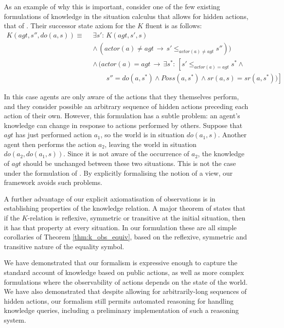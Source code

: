 As an example of why this is important, consider one of the few existing
formulations of knowledge in the situation calculus that allows for
hidden actions, that of \citep{Lesperance99sitcalc_approach}. Their
successor state axiom for the $K$ fluent is as follows:\begin{align*}
K(agt,s'',do(a,s))\equiv\,\,\, & \exists s':\, K(agt,s',s)\\
 & \wedge\,(actor(a)\neq agt\,\rightarrow\, s'\leq_{actor(a)\neq agt}s''))\\
 & \wedge\,(actor(a)=agt\,\rightarrow\,\exists s^{*}:\,\left[s'\leq_{actor(a)=agt}s^{*}\wedge\right.\\
 & \,\,\,\,\,\,\,\,\,\,\,\,\left.s''=do(a,s^{*})\wedge Poss(a,s^{*})\wedge sr(a,s)=sr(a,s^{*}))\right]\end{align*}


In this case agents are only aware of the actions that they themselves
perform, and they consider possible an arbitrary sequence of hidden
actions preceding each action of their own. However, this formulation
has a subtle problem: an agent's knowledge can change in response
to actions performed by others. Suppose that $agt$ has just performed
action $a_{1}$, so the world is in situation $do(a_{1},s)$. Another
agent then performs the action $a_{2}$, leaving the world in situation
$do(a_{2},do(a_{1},s))$. Since it is not aware of the occurrence
of $a_{2}$, the knowledge of $agt$ should be unchanged between these
two situations. This is not the case under the formulation of \citeauthor{Lesperance99sitcalc_approach}.
By explicitly formalising the notion of a view, our framework avoids
such problems.

A further advantage of our explicit axiomatisation of observations
is in establishing properties of the knowledge relation. A major theorem
of \citet{scherl03sc_knowledge} states that if the $K$-relation
is reflexive, symmetric or transitive at the initial situation, then
it has that property at every situation. In our formulation these
are all simple corollaries of Theorem \ref{thm:k_obs_equiv}, based
on the reflexive, symmetric and transitive nature of the equality
symbol.

We have demonstrated that our formalism is expressive enough to capture
the standard account of knowledge based on public actions, as well
as more complex formulations where the observability of actions depends
on the state of the world. We have also demonstrated that despite
allowing for arbitrarily-long sequences of hidden actions, our formalism
still permits automated reasoning for handling knowledge queries,
including a preliminary implementation of such a reasoning system.

